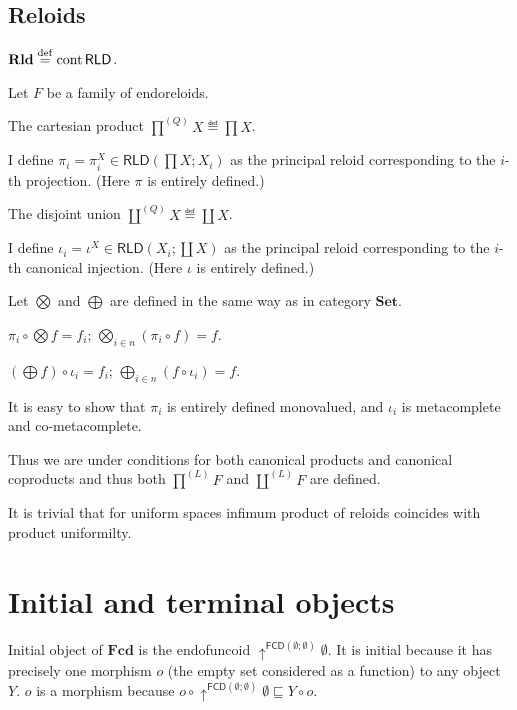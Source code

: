 \subsection{Reloids}

\begin{defn}
  $\mathbf{Rld} \overset{\mathrm{def}}{=} \operatorname{cont} \mathsf{RLD}$.
\end{defn}

Let $F$ be a family of endoreloids.

The cartesian product $\prod^{(Q)} X \eqdef \prod X$.

I define $\pi_i = \pi^X_i \in \mathsf{RLD} \left( \prod X ; X_i
\right)$ as the principal reloid corresponding to the $i$-th projection. (Here
$\pi$ is entirely defined.)

The disjoint union $\coprod^{(Q)} X \eqdef \coprod X$.

I define $\iota_i = \iota^X \in
\mathsf{RLD} \left( X_i ; \coprod X \right)$ as the principal reloid
corresponding to the $i$-th canonical injection. (Here $\iota$ is entirely
defined.)

Let $\bigotimes$ and $\bigoplus$ are defined in the same way as in category
$\mathbf{Set}$.

\begin{obvious}
$\pi_i \circ \bigotimes f = f_i$; $\bigotimes_{i \in n} (\pi_i \circ f) =
f$.
\end{obvious}

\begin{obvious}
$\left( \bigoplus f \right) \circ \iota_i = f_i$; $\bigoplus_{i \in n} (f
\circ \iota_i) = f$.
\end{obvious}

It is easy to show that $\pi_i$ is entirely defined monovalued, and $\iota_i$
is metacomplete and co-metacomplete.

Thus we are under conditions for both canonical products and canonical
coproducts and thus both $\prod^{(L)} F$ and $\coprod^{(L)} F$ are defined.

It is trivial that for uniform spaces infimum product of reloids coincides
with product uniformilty.

\section{Initial and terminal objects}

Initial object of $\mathbf{Fcd}$ is the endofuncoid
$\uparrow^{\mathsf{FCD} (\emptyset ; \emptyset)} \emptyset$. It is
initial because it has precisely one morphism $o$ (the empty set considered as
a function) to any object $Y$. $o$ is a morphism because $o \circ
\uparrow^{\mathsf{FCD} (\emptyset ; \emptyset)} \emptyset \sqsubseteq Y
\circ o$.

